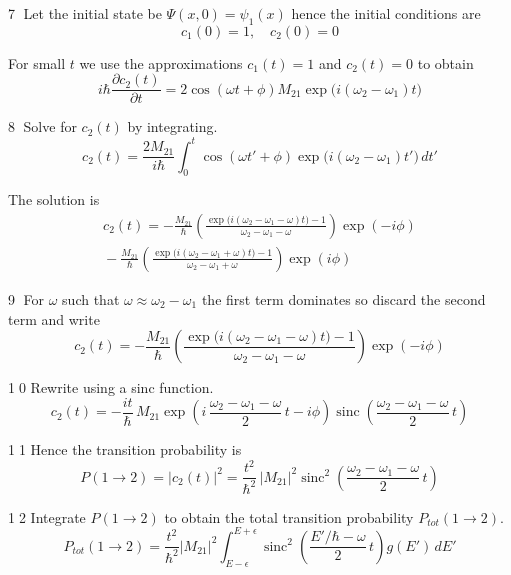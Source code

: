 \documentclass[12pt]{article}
\begin{document}
\textcircled{\scriptsize7}
Let the initial state be $\Psi(x,0)=\psi_1(x)$ hence the initial conditions are
\begin{equation*}
c_1(0)=1,\quad c_2(0)=0
\end{equation*}

For small $t$ we use the approximations $c_1(t)=1$ and $c_2(t)=0$ to obtain
\begin{equation*}
i\hbar\frac{\partial c_2(t)}{\partial t}
=2\cos(\omega t+\phi)M_{21}\exp\bigl(i(\omega_2-\omega_1)t\bigr)
\end{equation*}

\textcircled{\scriptsize8}
Solve for $c_2(t)$ by integrating.
\begin{equation*}
c_2(t)=\frac{2M_{21}}{i\hbar}
\int_0^t\cos(\omega t'+\phi)\exp\bigl(i(\omega_2-\omega_1)t'\bigr)\,dt'
\end{equation*}

The solution is
\begin{multline*}
c_2(t)
=-\frac{M_{21}}{\hbar}
\left(
\frac{\exp\bigl(i(\omega_2-\omega_1-\omega) t\bigr)-1}{\omega_2-\omega_1-\omega}
\right)\exp(-i\phi)
\\
{}-\frac{M_{21}}{\hbar}
\left(
\frac{\exp\bigl(i(\omega_2-\omega_1+\omega) t\bigr)-1}{\omega_2-\omega_1+\omega}
\right)\exp(i\phi)
\end{multline*}

\textcircled{\scriptsize9}
For $\omega$ such that $\omega\approx\omega_2-\omega_1$ the first term
dominates so discard the second term and write
\begin{equation*}
c_2(t)=-\frac{M_{21}}{\hbar}
\left(
\frac{\exp\bigl(i(\omega_2-\omega_1-\omega) t\bigr)-1}{\omega_2-\omega_1-\omega}
\right)\exp(-i\phi)
\end{equation*}

\textcircled{\scriptsize10}
Rewrite using a sinc function.
\begin{equation*}
c_2(t)=-\frac{it}{\hbar}\,M_{21}
\exp\left(i\,\frac{\omega_2-\omega_1-\omega}{2}\,t-i\phi\right)
\operatorname{sinc}\left(\frac{\omega_2-\omega_1-\omega}{2}\,t\right)
\end{equation*}

\textcircled{\scriptsize11}
Hence the transition probability is
\begin{equation*}
P(1\rightarrow2)=|c_2(t)|^2=\frac{t^2}{\hbar^2}\,|M_{21}|^2
\operatorname{sinc}^2\left(\frac{\omega_2-\omega_1-\omega}{2}\,t\right)
\end{equation*}

\textcircled{\scriptsize12}
Integrate $P(1\rightarrow2)$ to obtain the total transition probability
$P_{tot}(1\rightarrow2)$.
\begin{equation*}
P_{tot}(1\rightarrow2)=\frac{t^2}{\hbar^2}|M_{21}|^2
\int_{E-\epsilon}^{E+\epsilon}
\operatorname{sinc}^2\left(\frac{E'/\hbar-\omega}{2}\,t\right)
g(E')\,dE'
\end{equation*}
\end{document}
